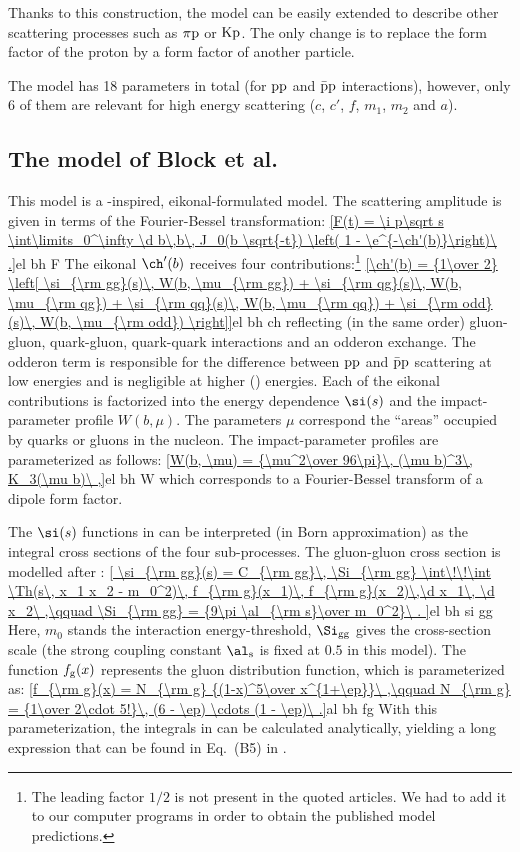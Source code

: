Thanks to this construction, the model can be easily extended to describe other scattering processes such as $\rm \pi p$ or $\rm Kp$. The only change is to replace the form factor of the proton by a form factor of another particle.

The model has 18 parameters in total (for $\rm pp$ and $\rm \bar p p$ interactions), however, only 6 of them are relevant for high energy scattering ($c$, $c'$, $f$, $m_1$, $m_2$ and $a$).



\subsection{The model of Block et al.}

This model  is a -inspired, eikonal-formulated model. The scattering amplitude is given in terms of the Fourier-Bessel transformation:
\eqref{F(t) = \i p\sqrt s \int\limits_0^\infty \d b\,b\, J_0(b \sqrt{-t}) \left( 1 - \e^{-\ch'(b)}\right)\ .}{el bh F}
The eikonal $\ch'(b)$ receives four contributions:\footnote{%
The leading factor $1/2$ is not present in the quoted articles. We had to add it to our computer programs in order to obtain the published model predictions.
}
\eqref{\ch'(b) = {1\over 2} \left[
	\si_{\rm gg}(s)\, W(b, \mu_{\rm gg}) 
	+ \si_{\rm qg}(s)\, W(b, \mu_{\rm qg}) 
	+ \si_{\rm qq}(s)\, W(b, \mu_{\rm qq}) 
	+ \si_{\rm odd}(s)\, W(b, \mu_{\rm odd}) 
\right]}{el bh ch}
reflecting (in the same order) gluon-gluon, quark-gluon, quark-quark interactions and an odderon exchange. The odderon term is responsible for the difference between $\rm pp$ and $\rm\bar pp$ scattering at low energies and is negligible at higher () energies. Each of the eikonal contributions is factorized into the energy dependence $\si(s)$ and the impact-parameter profile $W(b, \mu)$. The parameters $\mu$ correspond the ``areas'' occupied by quarks or gluons in the nucleon. The impact-parameter profiles are parameterized as follows:
\eqref{W(b, \mu) = {\mu^2\over 96\pi}\, (\mu b)^3\, K_3(\mu b)\ ,}{el bh W}
which corresponds to a Fourier-Bessel transform of a dipole form factor.

The $\si(s)$ functions in  can be interpreted (in Born approximation) as the integral cross sections of the four sub-processes. The gluon-gluon cross section is modelled after :
\eqref{
	\si_{\rm gg}(s) = C_{\rm gg}\, \Si_{\rm gg} \int\!\!\int \Th(s\, x_1 x_2 - m_0^2)\, f_{\rm g}(x_1)\, f_{\rm g}(x_2)\,\d x_1\, \d x_2\ ,\qquad
	\Si_{\rm gg} = {9\pi \al_{\rm s}\over m_0^2}\ .
}{el bh si gg}
Here, $m_0$ stands the interaction energy-threshold, $\Si_{\rm gg}$ gives the cross-section scale (the strong coupling constant $\al_{\rm s}$ is fixed at $0.5$ in this model). The function $f_{\rm g}(x)$ represents the gluon distribution function, which is parameterized as:
\eqref{f_{\rm g}(x) = N_{\rm g} {(1-x)^5\over x^{1+\ep}}\ ,\qquad N_{\rm g} = {1\over 2\cdot 5!}\, (6 - \ep) \cdots (1 - \ep)\ .}{al bh fg} 
With this parameterization, the integrals in  can be calculated analytically, yielding a long expression that can be found in Eq.~(B5) in .

